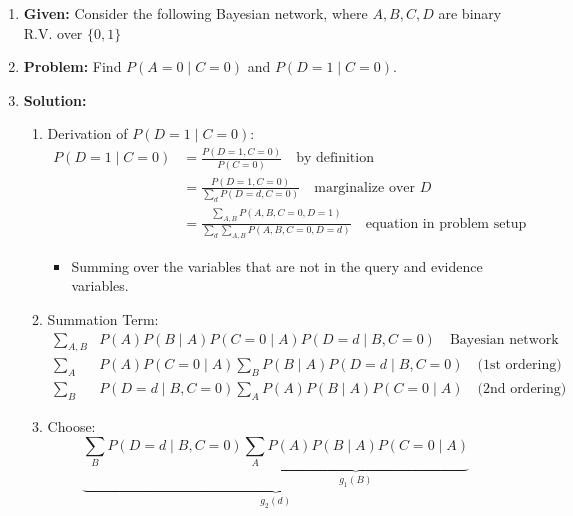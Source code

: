 \begin{example} 
    \begin{enumerate}
        \item \textbf{Given:} Consider the following Bayesian network, where $A,B,C,D$ are binary R.V. over $\{0,1\}$
        \item \textbf{Problem:} Find $P(A=0 \mid C=0)$ and $P(D=1 \mid C=0)$.
        \item \textbf{Solution:}
        \begin{enumerate}
            \item Derivation of \( P(D=1 \mid C=0) \): 
            \begin{align*}
                P(D=1 \mid C=0) &= \frac{P(D=1,C=0)}{P(C=0)} \quad \text{by definition}\\
                &= \frac{P(D=1,C=0)}{\sum_d P(D=d,C=0)} \quad \text{marginalize over $D$}\\
                &= \frac{\sum_{A,B} P(A,B,C=0,D=1)}{\sum_d \sum_{A,B} P(A,B,C=0,D=d)} \quad \text{equation in problem setup} 
            \end{align*}
            \begin{itemize}
                \item Summing over the variables that are not in the query and evidence variables.
            \end{itemize}
            
            \item Summation Term: 
            \begin{align*}
                \sum_{A,B} & P(A) P(B \mid A) P(C=0 \mid A) P(D=d \mid B,C=0) \quad \text{Bayesian network} \\
                \sum_A & P(A) P(C=0 \mid A) \sum_B P(B \mid A) P(D=d \mid B,C=0) \quad \text{(1st ordering)} \\
                \sum_B & P(D=d \mid B,C=0) \sum_A P(A) P(B \mid A) P(C=0 \mid A) \quad \text{(2nd ordering)}
            \end{align*}
            
            \item Choose: 
            \[
            \underbrace{\sum_B P(D=d \mid B,C=0) \underbrace{\sum_A P(A) P(B \mid A) P(C=0 \mid A)}_{g_1(B)}}_{g_2(d)}
            \]
            

\end{enumerate}
\end{enumerate}
\end{example}
